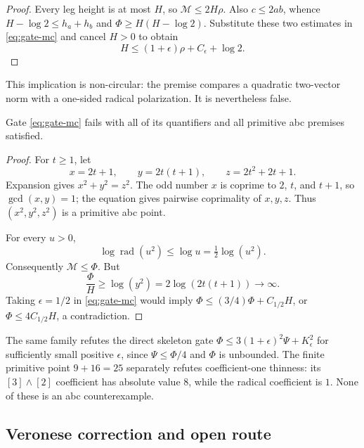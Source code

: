 \begin{proof}
Every leg height is at most $H$, so $\mathcal M\leq2H\rho$.  Also
$c\leq2ab$, whence $H-\log2\leq h_a+h_b$ and
$\Phi\geq H(H-\log2)$.  Substitute these two estimates in
\eqref{eq:gate-mc} and cancel $H>0$ to obtain
\[
 H\leq(1+\epsilon)\rho+C_\epsilon+\log2.
\]
\end{proof}

This implication is non-circular: the premise compares a quadratic
two-vector norm with a one-sided radical polarization.  It is nevertheless
false.

\begin{theorem}
\label{thm:pyth-square-obstruction}
Gate \eqref{eq:gate-mc} fails with all of its quantifiers and all primitive
abc premises satisfied.
\end{theorem}

\begin{proof}
For $t\geq1$, let
\[
 x=2t+1,\qquad y=2t(t+1),\qquad z=2t^2+2t+1.
\]
Expansion gives $x^2+y^2=z^2$.  The odd number $x$ is coprime to $2$, $t$,
and $t+1$, so $\gcd(x,y)=1$; the equation gives pairwise coprimality of
$x,y,z$.  Thus $(x^2,y^2,z^2)$ is a primitive abc point.

For every $u>0$,
\[
 \log\operatorname{rad}(u^2)\leq\log u
       =\tfrac12\log(u^2).
\]
Consequently $\mathcal M\leq\Phi$.  But
\[
 \frac{\Phi}{H}\geq\log(y^2)=2\log(2t(t+1))\longrightarrow\infty.
\]
Taking $\epsilon=1/2$ in \eqref{eq:gate-mc} would imply
$\Phi\leq(3/4)\Phi+C_{1/2}H$, or $\Phi\leq4C_{1/2}H$, a contradiction.
\end{proof}

The same family refutes the direct skeleton gate
$\Phi\leq3(1+\epsilon)^2\Psi+K_\epsilon^2$ for sufficiently small positive
$\epsilon$, since $\Psi\leq\Phi/4$ and $\Phi$ is unbounded.  The finite
primitive point $9+16=25$ separately refutes coefficient-one thinness: its
$[3]\wedge[2]$ coefficient has absolute value $8$, while the radical
coefficient is $1$.  None of these is an abc counterexample.

\subsection{Veronese correction and open route}

